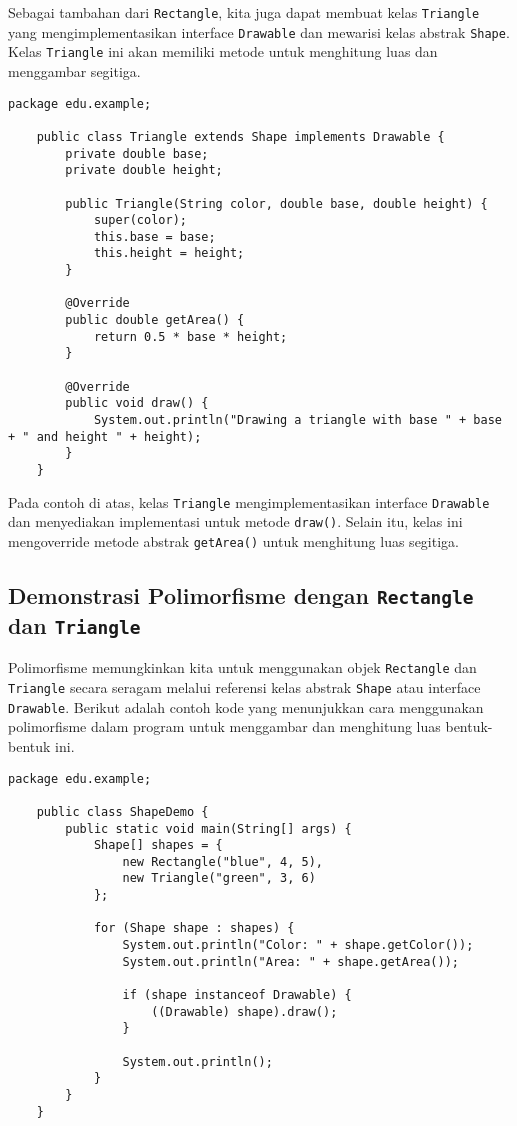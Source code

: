 Sebagai tambahan dari \texttt{Rectangle}, kita juga dapat membuat kelas \texttt{Triangle} yang mengimplementasikan interface \texttt{Drawable} dan mewarisi kelas abstrak \texttt{Shape}. Kelas \texttt{Triangle} ini akan memiliki metode untuk menghitung luas dan menggambar segitiga.

\begin{lstlisting}[style=JavaStyle]
	package edu.example;
	
	public class Triangle extends Shape implements Drawable {
		private double base;
		private double height;
		
		public Triangle(String color, double base, double height) {
			super(color);
			this.base = base;
			this.height = height;
		}
		
		@Override
		public double getArea() {
			return 0.5 * base * height;
		}
		
		@Override
		public void draw() {
			System.out.println("Drawing a triangle with base " + base + " and height " + height);
		}
	}
\end{lstlisting}

Pada contoh di atas, kelas \texttt{Triangle} mengimplementasikan interface \texttt{Drawable} dan menyediakan implementasi untuk metode \texttt{draw()}. Selain itu, kelas ini mengoverride metode abstrak \texttt{getArea()} untuk menghitung luas segitiga.

\subsection{Demonstrasi Polimorfisme dengan \texttt{Rectangle} dan \texttt{Triangle}}

Polimorfisme memungkinkan kita untuk menggunakan objek \texttt{Rectangle} dan \texttt{Triangle} secara seragam melalui referensi kelas abstrak \texttt{Shape} atau interface \texttt{Drawable}. Berikut adalah contoh kode yang menunjukkan cara menggunakan polimorfisme dalam program untuk menggambar dan menghitung luas bentuk-bentuk ini.

\begin{lstlisting}[style=JavaStyle]
	package edu.example;
	
	public class ShapeDemo {
		public static void main(String[] args) {
			Shape[] shapes = {
				new Rectangle("blue", 4, 5),
				new Triangle("green", 3, 6)
			};
			
			for (Shape shape : shapes) {
				System.out.println("Color: " + shape.getColor());
				System.out.println("Area: " + shape.getArea());
				
				if (shape instanceof Drawable) {
					((Drawable) shape).draw();
				}
				
				System.out.println();
			}
		}
	}
\end{lstlisting}

